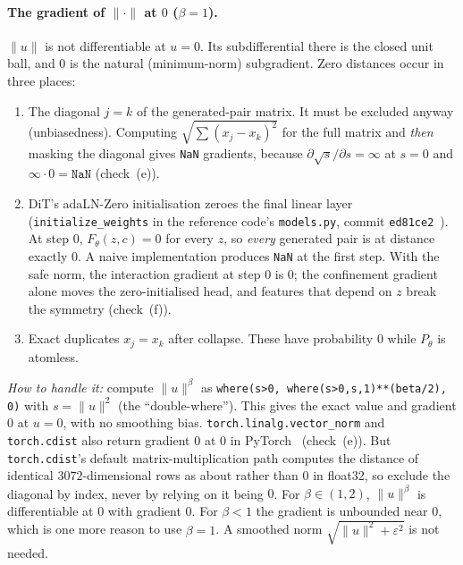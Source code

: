 \documentclass[11pt]{article}
\theoremstyle{definition}
\theoremstyle{remark}
\newcommand{\norm}[1]{\lVert #1\rVert}
\begin{document}
\paragraph{The gradient of $\norm{\cdot}$ at $0$ ($\beta=1$).} $\norm{u}$ is not differentiable at $u=0$.
Its subdifferential there is the closed unit ball, and $0$ is the natural (minimum-norm) subgradient. Zero
distances occur in three places:
\begin{enumerate}
\item The diagonal $j=k$ of the generated-pair matrix. It must be excluded anyway (unbiasedness). Computing
$\sqrt{\sum(x_j-x_k)^2}$ for the full matrix and \emph{then} masking the diagonal gives \texttt{NaN} gradients,
because $\partial\sqrt{s}/\partial s=\infty$ at $s=0$ and $\infty\cdot0=\texttt{NaN}$ (check~(e)).
\item DiT's adaLN-Zero initialisation zeroes the final linear layer (\texttt{initialize\_weights} in the
reference code's \texttt{models.py}, commit \texttt{ed81ce2}~\cite{DiTcode}). At step $0$,
$F_\theta(z,c)=0$ for every $z$, so \emph{every} generated pair is at distance exactly $0$. A naive
implementation produces \texttt{NaN} at the first step. With the safe norm, the interaction gradient at
step $0$ is $0$; the confinement gradient alone moves the zero-initialised head, and features that depend on
$z$ break the symmetry (check~(f)).
\item Exact duplicates $x_j=x_k$ after collapse. These have probability $0$ while $P_\theta$ is atomless.
\end{enumerate}
\emph{How to handle it:} compute $\norm{u}^\beta$ as \texttt{where(s>0, where(s>0,s,1)**(beta/2), 0)} with
$s=\norm{u}^2$ (the ``double-where''). This gives the exact value and gradient $0$ at $u=0$, with no
smoothing bias. \texttt{torch.linalg.vector\_norm} and \texttt{torch.cdist} also return gradient $0$ at $0$ in
PyTorch~\resTorchVersion{} (check~(e)). But \texttt{torch.cdist}'s default matrix-multiplication path
computes the distance of identical $3072$-dimensional rows as about \resEcdistDiag{} rather than $0$ in
float32, so exclude the diagonal by index, never by relying on it being $0$. For $\beta\in(1,2)$,
$\norm{u}^\beta$ is differentiable at $0$ with gradient $0$. For $\beta<1$ the gradient is unbounded near
$0$, which is one more reason to use $\beta=1$. A smoothed norm $\sqrt{\norm u^2+\varepsilon^2}$ is not
needed.
\end{document}

